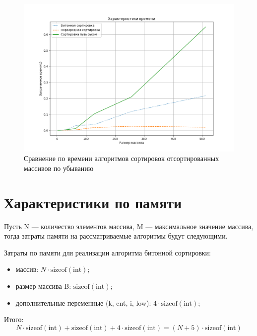 \begin{figure}[h]
	\begin{center}
		\includegraphics[scale=0.6]{img/time_des.png}
	\end{center}
	\captionsetup{justification=centering}
	\caption{Сравнение по времени алгоритмов сортировок отсортированных массивов по убыванию}
	\label{img:time_des}
\end{figure}
\clearpage

\section{Характеристики по памяти}

Пусть N — количество элементов массива, M — максимальное значение массива, тогда затраты памяти на рассматриваемые алгоритмы будут следующими.

Затраты по памяти для реализации алгоритма битонной сортировки:
\begin{itemize}
	\item массив: $N \cdot \text{sizeof}(\text{int})$;
	\item размер массива B: $\text{sizeof}(\text{int})$;
	\item дополнительные переменные (k, cnt, i, low): $4\cdot \text{sizeof}(\text{int})$;
\end{itemize}

Итого:
\begin{equation}
	\label{eq:bitonic}
	N \cdot \text{sizeof}(\text{int}) + \text{sizeof}(\text{int}) + 4\cdot \text{sizeof}(\text{int}) = (N + 5) \cdot \text{sizeof}(\text{int}) 
\end{equation}

